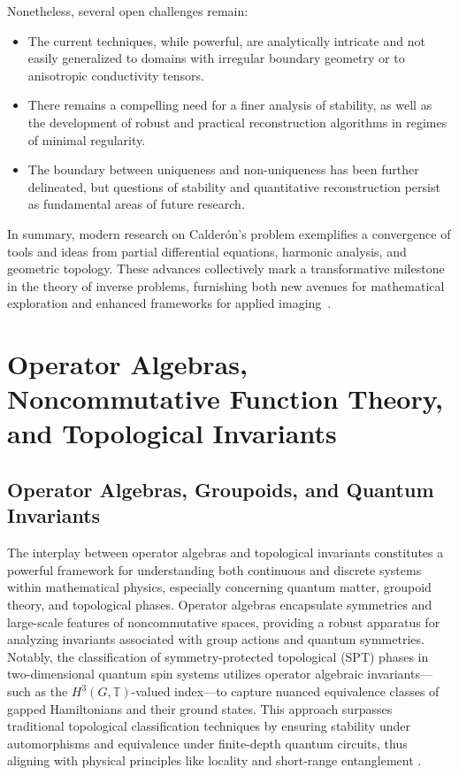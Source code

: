 \documentclass[sigconf]{acmart}
\begin{document}
Nonetheless, several open challenges remain:

\begin{itemize}
    \item The current techniques, while powerful, are analytically intricate and not easily generalized to domains with irregular boundary geometry or to anisotropic conductivity tensors.
    \item There remains a compelling need for a finer analysis of stability, as well as the development of robust and practical reconstruction algorithms in regimes of minimal regularity.
    \item The boundary between uniqueness and non-uniqueness has been further delineated, but questions of stability and quantitative reconstruction persist as fundamental areas of future research.
\end{itemize}

In summary, modern research on Calderón's problem exemplifies a convergence of tools and ideas from partial differential equations, harmonic analysis, and geometric topology. These advances collectively mark a transformative milestone in the theory of inverse problems, furnishing both new avenues for mathematical exploration and enhanced frameworks for applied imaging~\cite{ref102}.

\section{Operator Algebras, Noncommutative Function Theory, and Topological Invariants}

\subsection{Operator Algebras, Groupoids, and Quantum Invariants}

The interplay between operator algebras and topological invariants constitutes a powerful framework for understanding both continuous and discrete systems within mathematical physics, especially concerning quantum matter, groupoid theory, and topological phases. Operator algebras encapsulate symmetries and large-scale features of noncommutative spaces, providing a robust apparatus for analyzing invariants associated with group actions and quantum symmetries. Notably, the classification of symmetry-protected topological (SPT) phases in two-dimensional quantum spin systems utilizes operator algebraic invariants—such as the $H^3(G, \mathbb{T})$-valued index—to capture nuanced equivalence classes of gapped Hamiltonians and their ground states. This approach surpasses traditional topological classification techniques by ensuring stability under automorphisms and equivalence under finite-depth quantum circuits, thus aligning with physical principles like locality and short-range entanglement \cite{ref18}.
\end{document}

